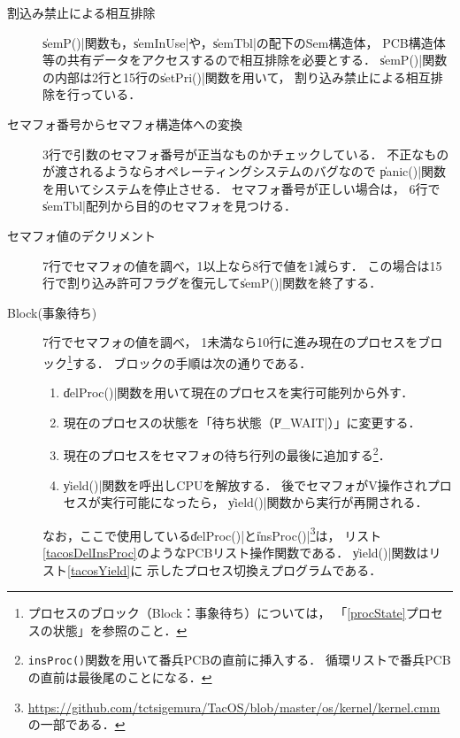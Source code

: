 \begin{description}
\item [割込み禁止による相互排除]
  \|semP()|関数も，\|semInUse|や，\|semTbl|の配下のSem構造体，
  PCB構造体等の共有データをアクセスするので相互排除を必要とする．
  \|semP()|関数の内部は2行と15行の\|setPri()|関数を用いて，
  割り込み禁止による相互排除を行っている．

\item [セマフォ番号からセマフォ構造体への変換]
  3行で引数のセマフォ番号が正当なものかチェックしている．
  不正なものが渡されるようならオペレーティングシステムのバグなので
  \|panic()|関数を用いてシステムを停止させる．
  セマフォ番号が正しい場合は，
  6行で\|semTbl|配列から目的のセマフォを見つける．

\item [セマフォ値のデクリメント]
  7行でセマフォの値を調べ，1以上なら8行で値を1減らす．
  この場合は15行で割り込み許可フラグを復元して\|semP()|関数を終了する．

\item [Block(事象待ち)]
  7行でセマフォの値を調べ，
  1未満なら10行に進み現在のプロセスをブロック\footnote{
    プロセスのブロック（Block：事象待ち）については，
    「\ref{procState}プロセスの状態」を参照のこと．}する．
  ブロックの手順は次の通りである．

  \begin{enumerate}
  \item \|delProc()|関数を用いて現在のプロセスを実行可能列から外す．
  \item 現在のプロセスの状態を「待ち状態（\|P_WAIT|）」に変更する．
  \item 現在のプロセスをセマフォの待ち行列の最後に追加する\footnote{
    \texttt{insProc()}関数を用いて番兵PCBの直前に挿入する．
    循環リストで番兵PCBの直前は最後尾のことになる．}．
  \item \|yield()|関数を呼出しCPUを解放する．
    後でセマフォがV操作されプロセスが実行可能になったら，
    \|yield()|関数から実行が再開される．
  \end{enumerate}

  なお，ここで使用している\|delProc()|と\|insProc()|\footnote{
  \url{https://github.com/tctsigemura/TacOS/blob/master/os/kernel/kernel.cmm}
  の一部である．}は，
  リスト\ref{tacosDelInsProc}のようなPCBリスト操作関数である．
  \|yield()|関数はリスト\ref{tacosYield}に
  示したプロセス切換えプログラムである．

  
\end{description}

